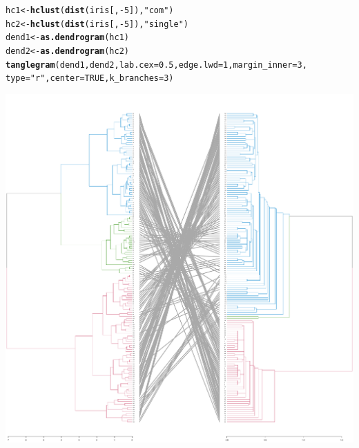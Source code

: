 \documentclass[shortnames,nojss,article]{jss}\usepackage[]{graphicx}\usepackage[]{color}
\makeatletter
\def\maxwidth{ %
  \ifdim\Gin@nat@width>\linewidth
    \linewidth
  \else
    \Gin@nat@width
  \fi
}
\newcommand{\hlnum}[1]{\textcolor[rgb]{0.686,0.059,0.569}{#1}}%
\newcommand{\hlstr}[1]{\textcolor[rgb]{0.192,0.494,0.8}{#1}}%
\newcommand{\hlopt}[1]{\textcolor[rgb]{0,0,0}{#1}}%
\newcommand{\hlstd}[1]{\textcolor[rgb]{0.345,0.345,0.345}{#1}}%
\newcommand{\hlkwb}[1]{\textcolor[rgb]{0.69,0.353,0.396}{#1}}%
\newcommand{\hlkwc}[1]{\textcolor[rgb]{0.333,0.667,0.333}{#1}}%
\newcommand{\hlkwd}[1]{\textcolor[rgb]{0.737,0.353,0.396}{\textbf{#1}}}%
\newenvironment{kframe}{%
 \def\at@end@of@kframe{}%
 \ifinner\ifhmode%
  \def\at@end@of@kframe{\end{minipage}}%
  \begin{minipage}{\columnwidth}%
 \fi\fi%
 \def\FrameCommand##1{\hskip\@totalleftmargin \hskip-\fboxsep
 \colorbox{shadecolor}{##1}\hskip-\fboxsep
     \hskip-\linewidth \hskip-\@totalleftmargin \hskip\columnwidth}%
 \MakeFramed {\advance\hsize-\width
   \@totalleftmargin\z@ \linewidth\hsize
   \@setminipage}}%
 {\par\unskip\endMakeFramed%
 \at@end@of@kframe}
\newenvironment{knitrout}{}{} %
\makeatother
\begin{document}
\begin{knitrout}
\color{fgcolor}\begin{kframe}
\begin{alltt}
\hlstd{hc1} \hlkwb{<-} \hlkwd{hclust}\hlstd{(}\hlkwd{dist}\hlstd{(iris[,} \hlopt{-}\hlnum{5}\hlstd{]),} \hlstr{"com"}\hlstd{)}
\hlstd{hc2} \hlkwb{<-} \hlkwd{hclust}\hlstd{(}\hlkwd{dist}\hlstd{(iris[,} \hlopt{-}\hlnum{5}\hlstd{]),} \hlstr{"single"}\hlstd{)}
\hlstd{dend1} \hlkwb{<-} \hlkwd{as.dendrogram}\hlstd{(hc1)}
\hlstd{dend2} \hlkwb{<-} \hlkwd{as.dendrogram}\hlstd{(hc2)}
\hlkwd{tanglegram}\hlstd{(dend1, dend2,} \hlkwc{lab.cex} \hlstd{=} \hlnum{0.5}\hlstd{,} \hlkwc{edge.lwd} \hlstd{=} \hlnum{1}\hlstd{,} \hlkwc{margin_inner} \hlstd{=} \hlnum{3}\hlstd{,}
    \hlkwc{type} \hlstd{=} \hlstr{"r"}\hlstd{,} \hlkwc{center} \hlstd{=} \hlnum{TRUE}\hlstd{,} \hlkwc{k_branches} \hlstd{=} \hlnum{3}\hlstd{)}
\end{alltt}


{\ttfamily\noindent\color{warningcolor}{\#\# Warning: Length of value vector was shorter than the number of leaves - vector value recycled\\\#\# Warning: Length of value vector was shorter than the number of leaves - vector value recycled}}\end{kframe}

{\centering \includegraphics[width=\maxwidth]{figure/first_tanglegram} 

}



\end{knitrout}
\end{document}
